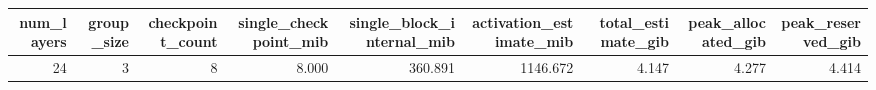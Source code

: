 \begin{tabular}{rrrrrrrrr}
\toprule
num\_layers & group\_size & checkpoint\_count & single\_checkpoint\_mib & single\_block\_internal\_mib & activation\_estimate\_mib & total\_estimate\_gib & peak\_allocated\_gib & peak\_reserved\_gib \\
\midrule
24 & 3 & 8 & 8.000 & 360.891 & 1146.672 & 4.147 & 4.277 & 4.414 \\
\bottomrule
\end{tabular}

